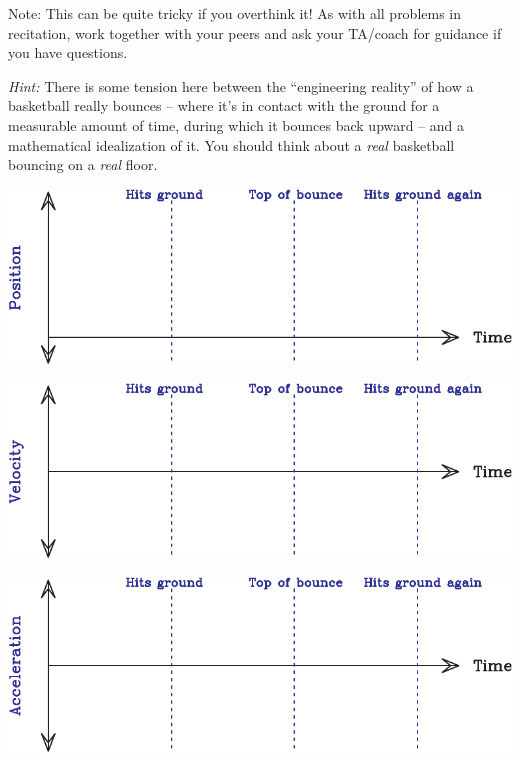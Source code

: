 \documentclass[12pt]{article}
\def\BS{\bigskip}
\begin{document}
Note: This can be quite tricky if you overthink it! As with all problems in recitation, work together with your peers and ask your TA/coach for guidance if you have questions.

\BS\BS

{\it Hint:} There is some tension here between the ``engineering reality'' of how a basketball really bounces -- where it's in contact with the ground for a measurable amount of time, during which it bounces back upward
-- and a mathematical idealization of it. You should think about a {\it real} basketball bouncing on a {\it real} floor.

\newpage


\begin{center}
	\includegraphics[width=\textwidth]{position-crop.pdf}
	
	\vspace{0.4in}
	
	\includegraphics[width=\textwidth]{velocity-crop.pdf}
	
	\vspace{0.4in}
	
	\includegraphics[width=\textwidth]{acceleration-crop.pdf}
\end{center}
\end{document}

